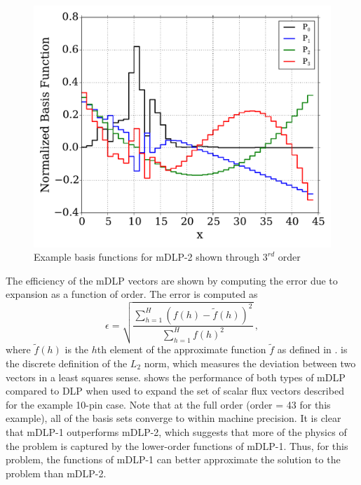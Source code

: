 \begin{figure}[bt]
    \centering
    \includegraphics[trim=.1cm .25cm .1cm .4cm, clip=true,
    totalheight=0.35\textheight]{Figures/mDLP2_L_basis}
    \caption{Example basis functions for mDLP-2 shown through $3^{rd}$ 
        order}
    \label{fig:mDLP2}
\end{figure}

The efficiency of the mDLP vectors are shown by computing the error due to 
expansion as a function of order.  The error is computed as
\begin{equation}
    \epsilon = \sqrt{\frac{\sum_{h=1}^H (f(h) - \tilde{f}(h))^2}{\sum_{h=1}^H
            f(h)^2}} \, ,
    \label{eq:l2norm}
\end{equation}
where $\tilde{f}(h)$ is the $h$th element of the approximate function $\tilde{f}$ as defined in 
.  is the discrete definition of 
the $L_2$ norm, which measures the deviation between two vectors in a least 
squares sense.  shows the 
performance of both types of mDLP compared to DLP when used to expand the set 
of scalar flux vectors described for the example 10-pin case.  Note that at 
the full order (order = 43 for this example), all of the basis sets converge 
to within machine precision. It is clear that 
mDLP-1 outperforms mDLP-2, which suggests that more of the physics of the problem 
is captured by the lower-order functions of mDLP-1.  Thus, for this problem, the 
functions of mDLP-1 can better approximate the solution to the problem than 
mDLP-2. 

